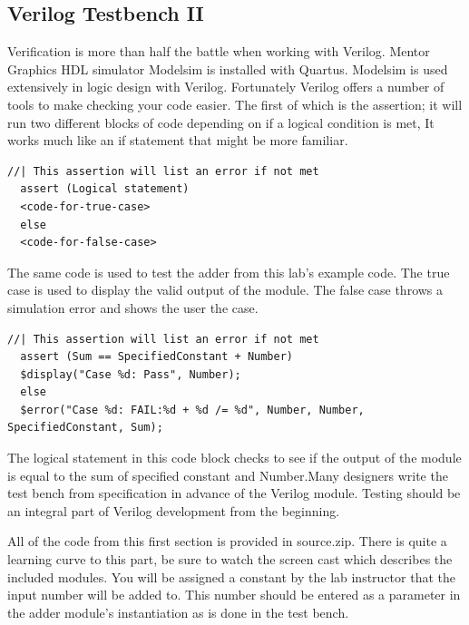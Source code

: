   \subsection{Verilog Testbench II}
    Verification is more than half the battle when working with Verilog. Mentor Graphics HDL simulator Modelsim is installed with Quartus. Modelsim is used extensively in logic design with Verilog. Fortunately Verilog offers a number of tools to make checking your code easier. The first of which is the assertion; it will run two different blocks of code depending on if a logical condition is met, It works much like an if statement that might be more familiar.
    \begin{lstlisting}[caption={Template for System Verilog assertion}]
  //| This assertion will list an error if not met
  assert (Logical statement)
  <code-for-true-case>
  else
  <code-for-false-case>
    \end{lstlisting}

    The same code is used to test the adder from this lab's example code. The true case is used to display the valid output of the module. The false case throws a simulation error and shows the user the case. 
    \begin{lstlisting}[caption={Assertion Example from test bench}]
  //| This assertion will list an error if not met
  assert (Sum == SpecifiedConstant + Number)
  $display("Case %d: Pass", Number);
  else
  $error("Case %d: FAIL:%d + %d /= %d", Number, Number, SpecifiedConstant, Sum);
    \end{lstlisting} 
    The logical statement in this code block checks to see if the output of the module is equal to the sum of specified constant and Number.Many designers write the test bench from specification in advance of the Verilog module. Testing should be an integral part of Verilog development from the beginning.

    All of the code from this first section is provided in source.zip. There is quite a learning curve to this part, be sure to watch the screen cast which describes the included modules. You will be assigned a constant by the lab instructor that the input number will be added to. This number should be entered as a parameter in the adder module's instantiation as is done in the test bench.

